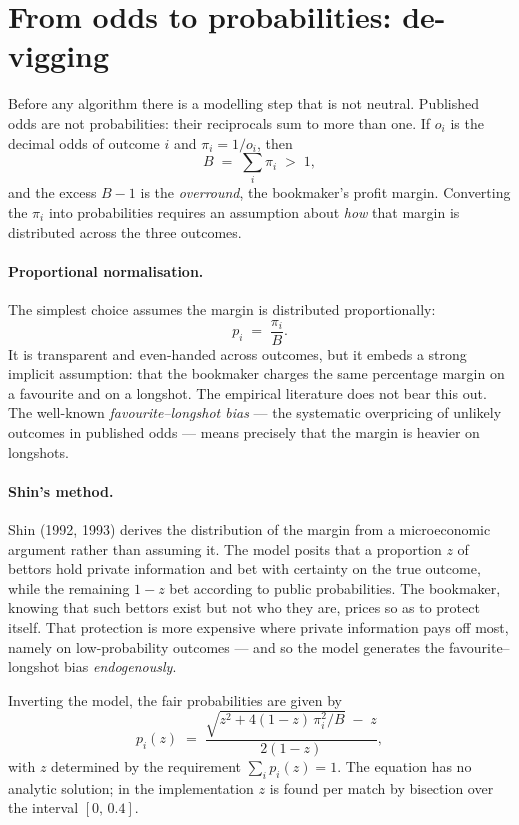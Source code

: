\documentclass[12pt,a4paper,oneside]{report}
\renewcommand{\_}{\oldunderscore\allowbreak}
\theoremstyle{definition}
\theoremstyle{plain}
\theoremstyle{remark}
\begin{document}
\section{From odds to probabilities: de-vigging}
\label{sec:devig-theory}

Before any algorithm there is a modelling step that is not neutral. Published odds are not
probabilities: their reciprocals sum to more than one. If $o_i$ is the decimal odds of outcome
$i$ and $\pi_i = 1/o_i$, then
\[
B \;=\; \sum_{i} \pi_i \;>\; 1,
\]
and the excess $B-1$ is the \emph{overround}, the bookmaker's profit margin. Converting the
$\pi_i$ into probabilities requires an assumption about \emph{how} that margin is distributed
across the three outcomes.

\paragraph{Proportional normalisation.} The simplest choice assumes the margin is distributed
proportionally:
\[
p_i \;=\; \frac{\pi_i}{B}.
\]
It is transparent and even-handed across outcomes, but it embeds a strong implicit assumption:
that the bookmaker charges the same percentage margin on a favourite and on a longshot. The
empirical literature does not bear this out. The well-known \emph{favourite--longshot bias} ---
the systematic overpricing of unlikely outcomes in published odds --- means precisely that the
margin is heavier on longshots.

\paragraph{Shin's method.} Shin (1992, 1993) derives the distribution of the margin from a
microeconomic argument rather than assuming it. The model posits that a proportion $z$ of
bettors hold private information and bet with certainty on the true outcome, while the
remaining $1-z$ bet according to public probabilities. The bookmaker, knowing that such bettors
exist but not who they are, prices so as to protect itself. That protection is more expensive
where private information pays off most, namely on low-probability outcomes --- and so the
model generates the favourite--longshot bias \emph{endogenously}.

Inverting the model, the fair probabilities are given by
\[
p_i(z) \;=\; \frac{\sqrt{z^2 + 4(1-z)\,\pi_i^2/B} \;-\; z}{2(1-z)},
\]
with $z$ determined by the requirement $\sum_i p_i(z) = 1$. The equation has no analytic
solution; in the implementation $z$ is found per match by bisection over the interval
$[0,\,0.4]$.
\end{document}
